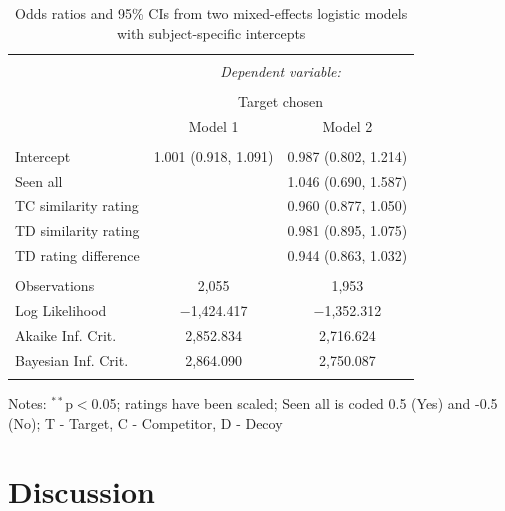 \documentclass[12pt, a4paper]{article}
\begin{document}
\begin{table}[htb] \centering
  \begin{threeparttable}
    \captionsetup{justification=centering}
    \caption{Odds ratios and 95\% CIs from two mixed-effects logistic models with subject-specific intercepts}
  \label{latentattr_exp2reg} 
\begin{tabular}{@{\extracolsep{5pt}}lcc} 
\\[-1.8ex]\hline 
\hline \\[-1.8ex] 
 & \multicolumn{2}{c}{\textit{Dependent variable:}} \\ 
\cline{2-3} 
\\[-1.8ex] & \multicolumn{2}{c}{Target chosen} \\ 
 & Model 1 & Model 2 \\ 
\hline \\[-1.8ex] 
 Intercept & 1.001 (0.918, 1.091) & 0.987 (0.802, 1.214) \\ 
  Seen all &  & 1.046 (0.690, 1.587) \\ 
  TC similarity rating &  & 0.960 (0.877, 1.050) \\ 
  TD similarity rating &  & 0.981 (0.895, 1.075) \\ 
  TD rating difference &  & 0.944 (0.863, 1.032) \\ 
 \hline \\[-1.8ex] 
Observations & 2,055 & 1,953 \\ 
Log Likelihood & $-$1,424.417 & $-$1,352.312 \\ 
Akaike Inf. Crit. & 2,852.834 & 2,716.624 \\ 
Bayesian Inf. Crit. & 2,864.090 & 2,750.087 \\ 
\hline 
\hline \\[-1.8ex] 
\end{tabular}  
    \begin{tablenotes}
      \small
      \item Notes: $^{**}$p$<$0.05; ratings have been scaled; Seen all is coded 0.5 (Yes) and -0.5 (No); T - Target, C - Competitor, D - Decoy
    \end{tablenotes}
  \end{threeparttable}
\end{table}


\section*{Discussion}
\end{document}
